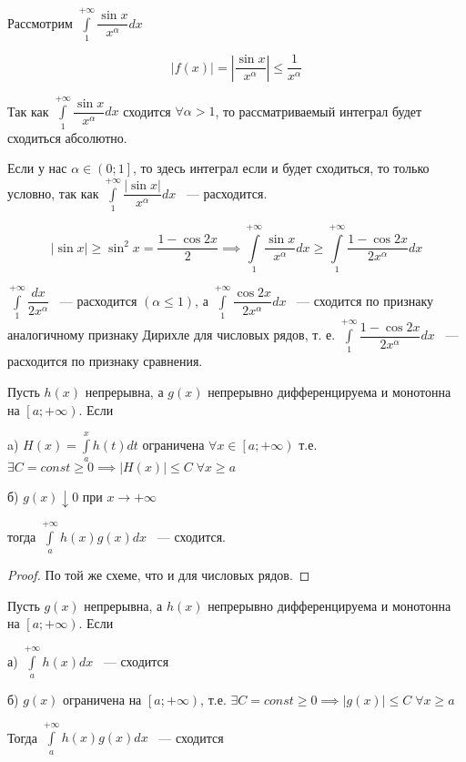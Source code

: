 \documentclass[../../main.tex]{subfiles}
\begin{document}
\begin{exmp}
 Рассмотрим $\displaystyle\int\limits_{1}^{+\infty} \dfrac{\sin{x}}{x^{\alpha}}dx$
 
 \[\left| f(x) \right| = \left| \dfrac{\sin{x}}{x^{\alpha}}\right| \leq \dfrac{1}{x^{\alpha}}\]
 
 Так как $\displaystyle\int\limits_{1}^{+\infty} \dfrac{\sin{x}}{x^{\alpha}}dx$ сходится $\forall \alpha  > 1$, то рассматриваемый интеграл будет сходиться абсолютно.
 
 Если у нас $\alpha \in \left(0; 1 \right]$, то здесь интеграл если и будет сходиться, то только условно, так как $\displaystyle\int\limits_{1}^{+\infty}\dfrac{\left| \sin{x}\right|}{x^{\alpha}}dx$ ~--- расходится.
 
 \[\left| \sin{x} \right| \geq \sin^2{x} = \dfrac{1-\cos{2x}}{2} \implies \int\limits_{1}^{+\infty} \dfrac{\sin{x}}{x^{\alpha}}dx \geq \int\limits_{1}^{+\infty} \dfrac{1 - \cos{2x}}{2x^{\alpha}}dx\]
 
 $\displaystyle\int\limits_{1}^{+\infty} \dfrac{dx}{2x^{\alpha}}$ ~--- расходится $(\alpha \leq 1)$, а $\displaystyle\int\limits_{1}^{+\infty} \dfrac{\cos{2x}}{2x^{\alpha}}dx$ ~--- сходится по признаку аналогичному признаку Дирихле для числовых рядов, т. е. $\displaystyle\int\limits_{1}^{+\infty} \dfrac{1 - \cos{2x}}{2x^{\alpha}}dx$ ~--- расходится по признаку сравнения. 
\end{exmp}

\begin{theorem}
 Пусть $h(x)$ непрерывна, а $g(x)$ непрерывно дифференцируема и монотонна на $\left[a; +\infty\right)$.
Если

a) $H(x) = \displaystyle\int\limits_{a}^{x}h(t)dt$ ограничена $\forall x \in \left[a; +\infty \right)$ т.е. $\exists C = const \geq 0 \implies \left| H(x) \right| \leq C \; \forall x \geq a$

б) $g(x) \downarrow 0$ при $x \to +\infty$

тогда $\displaystyle\int\limits_{a}^{+\infty}h(x)g(x)dx$ ~--- сходится.

\end{theorem}
\begin{proof}
 По той же схеме, что и для числовых рядов.
\end{proof}

\begin{thm}
Пусть $g(x)$ непрерывна, а $h(x)$ непрерывно дифференцируема и монотонна на $\left[a; +\infty \right)$. Если

а) $\displaystyle\int\limits_{a}^{+\infty}h(x)dx$ ~--- сходится

б) $g(x)$ ограничена на $\left[a; +\infty\right)$, т.е. $\exists C = const\geq 0 \implies \left| g(x) \right| \leq C \; \forall x \geq a$

Тогда $\displaystyle\int\limits_{a}^{+\infty} h(x)g(x)dx$ ~--- сходится
\end{thm}
\end{document}
